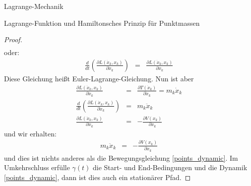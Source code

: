 \begin{chapter}{\titlestr}
\begin{section}{Lagrange-Mechanik}
\begin{subsection}{Lagrange-Funktion und Hamiltonsches Prinzip für Punktmassen}
\begin{proof}
\begin{eqnarray*}
\end{eqnarray*}
oder:
\begin{eqnarray}
\label{euler_lagrange_points}
\frac{d}{dt}\left(\frac{\partial L(\dot{x}_k,x_k)}{\partial \dot{x}_k}\right) &=& \frac{\partial L(\dot{x}_k, x_k)}{\partial x_k}
\end{eqnarray}
Diese Gleichung heißt Euler-Lagrange-Gleichung. Nun ist aber
\begin{eqnarray*}
\frac{\partial L(\dot{x}_k,x_k)}{\partial \dot{x}_k} &=& \frac{\partial T(\dot{x}_k)}{\partial \dot{x}_k} = m_k\dot{x}_k\\
\frac{d}{dt}\left(\frac{\partial L(\dot{x}_k,x_k)}{\partial \dot{x}_k}\right) &=& m_k\ddot{x}_k\\
\frac{\partial L(\dot{x}_k, x_k)}{\partial x_k} &=& -\frac{\partial V(x_k)}{\partial x_k}
\end{eqnarray*}
und wir erhalten:
\begin{eqnarray*}
m_k\ddot{x}_k &=& -\frac{\partial V(x_k)}{\partial x_k}
\end{eqnarray*}
und dies ist nichts anderes als die Bewegungsgleichung \ref{points_dynamic}. Im Umkehrschluss erfülle $\gamma(t)$ die Start- und End-Bedingungen und die Dynamik \ref{points_dynamic}, dann ist dies auch ein stationärer Pfad.
\end{proof}
\end{subsection}



\end{section}
\end{chapter}
